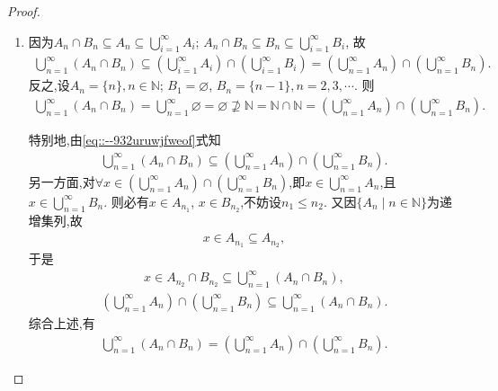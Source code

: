 \documentclass[../../main.tex]{subfiles}%
\begin{document}
\begin{proof}
\begin{enumerate}[(1)]
\item 因为$A_n \cap B_n \subseteq A_n \subseteq \bigcup_{i=1}^{\infty} A_i$; $A_n \cap B_n \subseteq B_n \subseteq \bigcup_{i=1}^{\infty} B_i$, 故
\begin{align}\label{eq::--932uruwjfweof}
\bigcup_{n=1}^{\infty} (A_n \cap B_n) \subseteq \left( \bigcup_{i=1}^{\infty} A_i \right) \cap \left( \bigcup_{i=1}^{\infty} B_i \right) = \left( \bigcup_{n=1}^{\infty} A_n \right) \cap \left( \bigcup_{n=1}^{\infty} B_n \right).
\end{align}
反之,设$A_n = \{n\}, n \in \mathbb{N}$; $B_1 = \varnothing$, $B_n = \{n-1\}, n=2,3,\cdots$. 则
\begin{align*}
\bigcup_{n=1}^{\infty} (A_n \cap B_n) = \bigcup_{n=1}^{\infty} \varnothing = \varnothing \nsupseteq \mathbb{N} = \mathbb{N} \cap \mathbb{N} = \left( \bigcup_{n=1}^{\infty} A_n \right) \cap \left( \bigcup_{n=1}^{\infty} B_n \right).
\end{align*}

特别地,由\eqref{eq::--932uruwjfweof}式知
\begin{align*}
\bigcup_{n=1}^{\infty} (A_n \cap B_n) \subseteq \left( \bigcup_{n=1}^{\infty} A_n \right) \cap \left( \bigcup_{n=1}^{\infty} B_n \right).
\end{align*}
另一方面,对$\forall x \in \left( \bigcup_{n=1}^{\infty} A_n \right) \cap \left( \bigcup_{n=1}^{\infty} B_n \right)$,即$x \in \bigcup_{n=1}^{\infty} A_n$,且$x \in \bigcup_{n=1}^{\infty} B_n$. 则必有$x \in A_{n_1}$, $x \in B_{n_2}$,不妨设$n_1 \leqslant n_2$. 又因$\{A_n \mid n \in \mathbb{N}\}$为递增集列,故
\begin{align*}
x \in A_{n_1} \subseteq A_{n_2},
\end{align*}
于是
\begin{align*}
x \in A_{n_2} \cap B_{n_2} \subseteq \bigcup_{n=1}^{\infty} (A_n \cap B_n),
\end{align*}
\begin{align*}
\left( \bigcup_{n=1}^{\infty} A_n \right) \cap \left( \bigcup_{n=1}^{\infty} B_n \right) \subseteq \bigcup_{n=1}^{\infty} (A_n \cap B_n).
\end{align*}
综合上述,有
\begin{align*}
\bigcup_{n=1}^{\infty} (A_n \cap B_n) = \left( \bigcup_{n=1}^{\infty} A_n \right) \cap \left( \bigcup_{n=1}^{\infty} B_n \right).
\end{align*}
\end{enumerate}
\end{proof}
\end{document}
